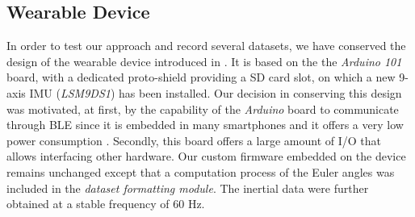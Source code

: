 \documentclass[10pt,conference]{IEEEtran}
\begin{document}
\subsection{Wearable Device}
In order to test our approach and record several datasets, we have conserved the design of the wearable device introduced in \cite{Thullier2017b}. It is based on the %
the \textit{Arduino 101} board, with a dedicated proto-shield providing a SD card slot, on which a new 9-axis IMU (\textit{LSM9DS1}) has been installed. %
Our decision in conserving this design was motivated, at first, by the capability of the \textit{Arduino} board to communicate through BLE since it is embedded in many smartphones {\cite{Taplett}} and it offers a very low power consumption {\cite{Gomez2012}}. Secondly, this board offers a large amount of I/O that allows interfacing other hardware. %
Our custom firmware embedded on the device remains unchanged except that a computation process of the Euler angles was included in the \textit{dataset formatting module}. The inertial data were further obtained at a stable frequency of 60 Hz.



\end{document}
